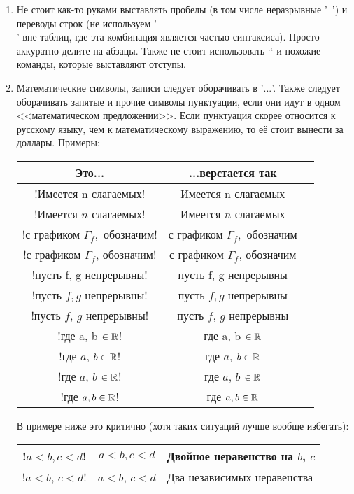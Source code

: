 \begin{enumerate}
\item
	Не стоит как-то руками выставлять пробелы (в том числе неразрывные \tex'~') и
	переводы строк (не используем \tex'\\' вне таблиц, где эта комбинация является частью синтаксиса).
	Просто аккуратно делите на абзацы.
	Также не стоит использовать \tex`\vspace` и похожие команды, которые выставляют отступы.

\item
	Математические символы, записи следует оборачивать в \tex'$...$'.
	Также следует оборачивать запятые и прочие символы пунктуации, если они
	идут в одном <<математическом предложении>>.
	Если пунктуация скорее относится к русскому языку, чем к математическому выражению, то её стоит вынести за доллары.
	Примеры:
	\begin{center}\begin{tabular}{|c|c|c|}
		\hline Это... & ...верстается так & \\
		\hline \tex!Имеется n слагаемых! & Имеется n слагаемых \bad \\
		\hline \tex!Имеется $n$ слагаемых! & Имеется $n$ слагаемых \ok \\
		\hline \tex!с графиком $\Gamma_f,$ обозначим! & с графиком $\Gamma_f,$ обозначим \bad \\
		\hline \tex!с графиком $\Gamma_f$, обозначим! & с графиком $\Gamma_f$, обозначим \ok \\
		\hline \tex!пусть f, g непрерывны! & пусть f, g непрерывны \bad \\
		\hline \tex!пусть $f, g$ непрерывны! & пусть $f, g$ непрерывны \bad \\
		\hline \tex!пусть $f$, $g$ непрерывны! & пусть $f$, $g$ непрерывны \ok \\
		\hline \tex!где a, b $\in \mathbb{R}$! & где a, b $\in \mathbb{R}$ \bad \\
		\hline \tex!где $a$, $b \in \mathbb{R}$! & где $a$, $b \in \mathbb{R}$ \bad \\
		\hline \tex!где $a$, $b$ $\in \mathbb{R}$! & где $a$, $b$ $\in \mathbb{R}$ \bad \\
		\hline \tex!где $a, b \in \mathbb{R}$! & где $a, b \in \mathbb{R}$ \ok \\
		\hline
	\end{tabular}\end{center}

	В примере ниже это критично (хотя таких ситуаций лучше вообще избегать):
	\begin{center}\begin{tabular}{|c|c|l|}
		\hline \tex!$a < b, c < d$! & $a < b, c < d$ & Двойное неравенство на $b$, $c$ \\
		\hline \tex!$a < b$, $c < d$! & $a < b$, $c < d$ & Два независимых неравенства \\
	\hline
	\end{tabular}\end{center}


\end{enumerate}
